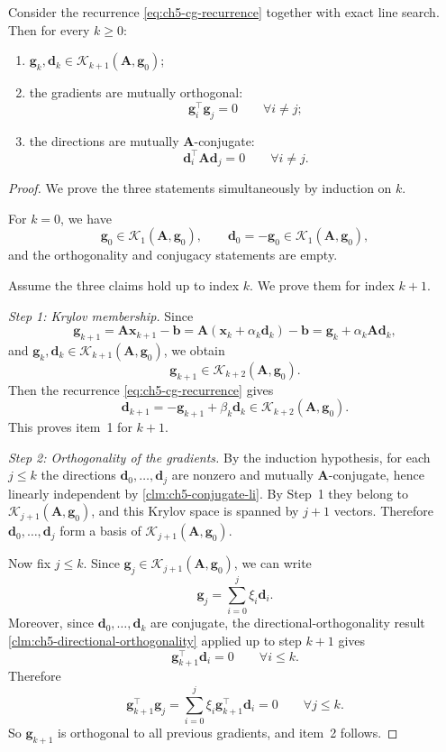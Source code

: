 \begin{theorem}
\label{thm:ch5-cg-core}
Consider the recurrence \eqref{eq:ch5-cg-recurrence} together with exact line
search. Then for every $k\ge 0$:
\begin{enumerate}
  \item
  $\mathbf{g}_k,\mathbf{d}_k\in \mathcal{K}_{k+1}(\mathbf{A},\mathbf{g}_0)$;
  \item the gradients are mutually orthogonal:
  \[
    \mathbf{g}_i^{\top}\mathbf{g}_j=0
    \qquad \forall i\neq j;
  \]
  \item the directions are mutually $\mathbf{A}$-conjugate:
  \[
    \mathbf{d}_i^{\top}\mathbf{A}\mathbf{d}_j=0
    \qquad \forall i\neq j.
  \]
\end{enumerate}
\end{theorem}
\begin{proof}
We prove the three statements simultaneously by induction on $k$.

For $k=0$, we have
\[
  \mathbf{g}_0\in \mathcal{K}_1(\mathbf{A},\mathbf{g}_0),
  \qquad
  \mathbf{d}_0=-\mathbf{g}_0\in \mathcal{K}_1(\mathbf{A},\mathbf{g}_0),
\]
and the orthogonality and conjugacy statements are empty.

Assume the three claims hold up to index $k$. We prove them for index $k+1$.

\emph{Step 1: Krylov membership.}
Since
\[
  \mathbf{g}_{k+1}
  =\mathbf{A}\mathbf{x}_{k+1}-\mathbf{b}
  =\mathbf{A}(\mathbf{x}_k+\alpha_k \mathbf{d}_k)-\mathbf{b}
  =\mathbf{g}_k+\alpha_k \mathbf{A}\mathbf{d}_k,
\]
and $\mathbf{g}_k,\mathbf{d}_k\in \mathcal{K}_{k+1}(\mathbf{A},\mathbf{g}_0)$,
we obtain
\[
  \mathbf{g}_{k+1}\in \mathcal{K}_{k+2}(\mathbf{A},\mathbf{g}_0).
\]
Then the recurrence \eqref{eq:ch5-cg-recurrence} gives
\[
  \mathbf{d}_{k+1}
  =-\mathbf{g}_{k+1}+\beta_k \mathbf{d}_k
  \in \mathcal{K}_{k+2}(\mathbf{A},\mathbf{g}_0).
\]
This proves item~1 for $k+1$.

\emph{Step 2: Orthogonality of the gradients.}
By the induction hypothesis, for each $j\le k$ the directions
$\mathbf{d}_0,\ldots,\mathbf{d}_j$ are nonzero and mutually
$\mathbf{A}$-conjugate, hence linearly independent by
\cref{clm:ch5-conjugate-li}. By Step~1 they belong to
$\mathcal{K}_{j+1}(\mathbf{A},\mathbf{g}_0)$, and this Krylov space is spanned
by $j+1$ vectors. Therefore $\mathbf{d}_0,\ldots,\mathbf{d}_j$ form a basis of
$\mathcal{K}_{j+1}(\mathbf{A},\mathbf{g}_0)$.

Now fix $j\le k$. Since $\mathbf{g}_j\in \mathcal{K}_{j+1}(\mathbf{A},\mathbf{g}_0)$,
we can write
\[
  \mathbf{g}_j=\sum_{i=0}^{j}\xi_i \mathbf{d}_i.
\]
Moreover, since $\mathbf{d}_0,\ldots,\mathbf{d}_k$ are conjugate, the
directional-orthogonality result \cref{clm:ch5-directional-orthogonality}
applied up to step $k+1$ gives
\[
  \mathbf{g}_{k+1}^{\top}\mathbf{d}_i=0
  \qquad \forall i\le k.
\]
Therefore
\[
  \mathbf{g}_{k+1}^{\top}\mathbf{g}_j
  =\sum_{i=0}^{j}\xi_i \mathbf{g}_{k+1}^{\top}\mathbf{d}_i
  =0
  \qquad \forall j\le k.
\]
So $\mathbf{g}_{k+1}$ is orthogonal to all previous gradients, and item~2
follows.


\end{proof}
